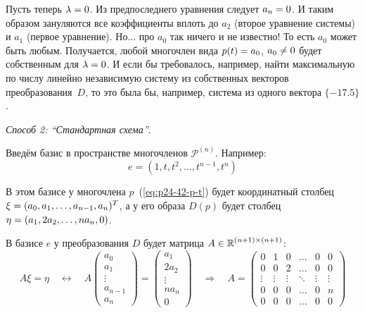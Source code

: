 \documentclass[a4paper,12pt]{article}
\begin{document}
\begin{solution}
    Пусть теперь $\lambda \hm= 0$.
    Из предпоследнего уравнения следует $a_n \hm= 0$.
    И таким образом зануляются все коэффициенты вплоть до $a_2$ (второе уравнение системы) и $a_1$ (первое уравнение).
    Но... про $a_0$ так ничего и не известно!
    То есть $a_0$ может быть любым.
    Получается, любой многочлен вида $p(t) \hm= a_0$, $a_0 \hm{\not=} 0$ будет собственным для $\lambda \hm= 0$.
    И если бы требовалось, например, найти максимальную по числу линейно независимую систему из собственных векторов преобразования~$D$, то это была бы, например, система из одного вектора $\{-17.5\}$.
    
    
    \emph{Способ 2: ``Стандартная схема''}.
    
    Введём базис в пространстве многочленов $\mathcal P^{(n)}$.
    Например:
    \[
      e = (1, t, t^2, \ldots, t^{n - 1}, t^n)
    \]
    
    В этом базисе у многочлена $p$~(\ref{eq:p24-42-p-t}) будет координатный столбец $\xi \hm= (a_0, a_1, \ldots, a_{n - 1}, a_n)^T$, а у его образа $D(p)$ будет столбец $\eta \hm= (a_1, 2 a_2, \ldots, n a_n, 0)$.
    
    В базисе $e$ у преобразования $D$ будет матрица $A \hm\in \RR^{(n + 1) \times (n + 1)}$:
    \[
      A \xi = \eta
      \quad\leftrightarrow\quad A \begin{pmatrix}
        a_0\\
        a_1\\
        \vdots\\
        a_{n - 1}\\
        a_n
      \end{pmatrix} = \begin{pmatrix}
        a_1\\
        2 a_2\\
        \vdots\\
        n a_n\\
        0
      \end{pmatrix}
      \quad\Rightarrow\quad A = \begin{pmatrix}
        0      & 1      & 0      & \ldots & 0      & 0\\
        0      & 0      & 2      & \ldots & 0      & 0\\
        \vdots & \vdots & \vdots & \ddots & \vdots & \vdots\\
        0      & 0      & 0      & \ldots & 0      & n\\
        0      & 0      & 0      & \ldots & 0      & 0
      \end{pmatrix}
    \]
    

\end{solution}
\end{document}
